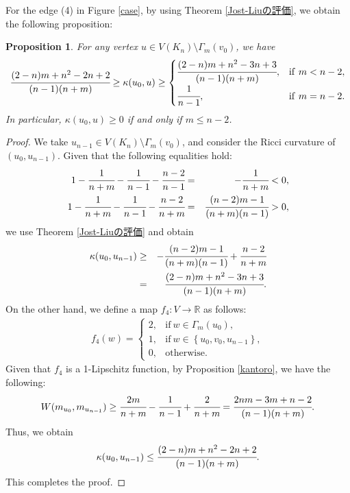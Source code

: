 \documentclass[leqno,12pt]{amsart} %
\theoremstyle{plain} %
\newtheorem{proposition}[theorem]{\indent\sc Proposition}
\theoremstyle{definition} %
\begin{document}
For the edge (4) in Figure \ref{case}, by using Theorem \ref{Jost-Liuの評価}, we obtain the following proposition:
\begin{proposition}
\label{４番目}
For any vertex $u \in V(K_n) \setminus \Gamma_m (v_0)$, we have
\begin{eqnarray*}
\cfrac{(2-n)m + n^2 -2n +2}{(n-1)(n+m)}  \geq \kappa(u_0, u) \geq 
\begin{cases}
\cfrac{(2-n)m +n^2 -3n +3}{(n-1)(n+m)}, & \mathrm{if}\ m < n-2,\\
\cfrac{1}{n-1}, & \mathrm{if}\ m=n-2.
\end{cases}
\end{eqnarray*}
In particular, $\kappa(u_0, u) \geq 0$ if and only if $m \leq n-2$.
\end{proposition}
\begin{proof}
We take $u_{n-1} \in V(K_n) \setminus \Gamma_m (v_0)$, and consider the Ricci curvature of $(u_0, u_{n-1})$. Given that the following equalities hold: 
\begin{eqnarray*}
1-\cfrac{1}{n+m}-\cfrac{1}{n-1}-\cfrac{n-2}{n-1} &=& - \cfrac{1}{n+m} <0, \\
1-\cfrac{1}{n+m}-\cfrac{1}{n-1}-\cfrac{n-2}{n+m} &=& \cfrac{(n-2)m -1}{(n+m)(n-1)} >0,
\end{eqnarray*}
we use Theorem \ref{Jost-Liuの評価} and obtain 
\begin{eqnarray*}
\kappa(u_0, u_{n-1}) &\geq& - \cfrac{(n-2)m -1}{(n+m)(n-1)} + \cfrac{n-2}{n+m}\\
&=& \cfrac{(2-n)m +n^2 -3n +3}{(n-1)(n+m)}.
\end{eqnarray*}
On the other hand, we define a map $f_4 : V \to \mathbb{R}$ as follows:
\begin{eqnarray*}
f_4 (w)=
\begin{cases}
2, & \mathrm{if}\ w \in \Gamma_m (u_0),\\
1, & \mathrm{if}\ w \in \left\{u_{0}, v_0, u_{n-1} \right\},\\
0, & \mathrm{otherwise}.
\end{cases}
\end{eqnarray*}
Given that $f_4$ is a 1-Lipschitz function, by Proposition \ref{kantoro}, we have the following:
\begin{eqnarray*}
W(m_{u_0}, m_{u_{n-1}}) \geq \cfrac{2m}{n+m} -\cfrac{1}{n-1} + \cfrac{2}{n+m}= \cfrac{2nm-3m + n-2}{(n-1)(n+m)}.
\end{eqnarray*}
Thus, we obtain
\begin{eqnarray*}
\kappa(u_0,u_{n-1})  \leq  \cfrac{(2-n)m + n^2 -2n +2}{(n-1)(n+m)} .
\end{eqnarray*}
This completes the proof.
\end{proof}
\end{document}
